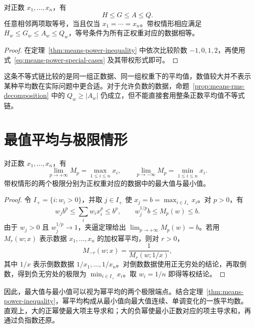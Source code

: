 \documentclass[UTF8,12pt,a4paper,fontset=fandol]{ctexart}
\begin{document}
\begin{corollary}
\label{cor:means-chain}
对正数 $x_1,\ldots,x_n$，有
\begin{equation}
\label{eq:means-chain}
  H\le G\le A\le Q.
\end{equation}
任意相邻两项取等号，当且仅当 $x_1=\cdots=x_n$。带权情形相应满足 $H_w\le G_w\le A_w\le Q_w$，等号条件为所有正权重对应的数据相等。
\end{corollary}

\begin{proof}
在定理~\ref{thm:means-power-inequality} 中依次比较阶数 $-1,0,1,2$，再使用式~\eqref{eq:means-power-special-cases} 及其带权形式即可。
\end{proof}

这条不等式链比较的是同一组正数据、同一组权重下的平均值，数值较大并不表示某种平均数在实际问题中更合适。对于允许负数的数据，命题~\ref{prop:means-rms-decomposition} 中的 $Q_w\ge|A_w|$ 仍成立，但不能直接套用整条正数平均值不等式链。

\section{最值平均与极限情形}
\label{sec:means-extreme-limits}

\begin{proposition}
\label{prop:means-extreme-limits}
对正数 $x_1,\ldots,x_n$，有
\[
  \lim_{p\to+\infty}M_p=\max_{1\le i\le n}x_i,
  \qquad
  \lim_{p\to-\infty}M_p=\min_{1\le i\le n}x_i.
\]
带权情形的两个极限分别为正权重对应的数据中的最大值与最小值。
\end{proposition}

\begin{proof}
令 $I_+=\{i:w_i>0\}$，并取 $j\in I_+$ 使 $x_j=b=\max_{i\in I_+}x_i$。对 $p>0$，有
\[
  w_jb^p\le\sum_iw_ix_i^p\le b^p,
  \qquad w_j^{1/p}b\le M_p(w)\le b.
\]
由于 $w_j>0$ 且 $w_j^{1/p}\to1$，夹逼定理给出 $\lim_{p\to+\infty}M_p(w)=b$。若用 $M_r(w;x)$ 表示数据 $x_1,\ldots,x_n$ 的加权幂平均，则对 $r>0$，
\[
  M_{-r}(w;x)=\frac{1}{M_r(w;1/x)},
\]
其中 $1/x$ 表示倒数数据 $1/x_1,\ldots,1/x_n$。对倒数数据使用正无穷处的结论，再取倒数，得到负无穷处的极限为 $\min_{i\in I_+}x_i$。取 $w_i=1/n$ 即得等权结论。
\end{proof}

因此，最大值与最小值可以视为幂平均的两个极限端点。结合定理~\ref{thm:means-power-inequality}，幂平均构成从最小值向最大值连续、单调变化的一族平均数。直观上，大的正幂使最大项主导求和；大的负幂使最小正数对应的项主导求和，再通过负指数还原。
\end{document}
